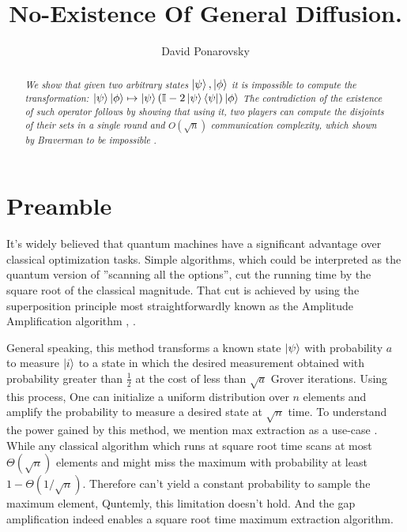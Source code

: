 \documentclass{article}
\begin{document}
\title{No-Existence Of General Diffusion.}
\author{David Ponarovsky}
\maketitle

\begin{abstract}\textit{We show that given two arbitrary states $\ket{\psi},\ket{\phi}$ it is impossible to compute the transformation: $ \ket{\psi}\ket{\phi} \mapsto \ket{\psi}\left( \mathbb{I} - 2 \ket{\psi}\bra{\psi} \right)\ket{\phi} $ The contradiction of the existence of such operator follows by showing that using it, two players can compute the disjoints of their sets in a single round and $O\left( \sqrt{n} \right)$ communication complexity, which shown by Braverman to be impossible \cite{Braverman}. }
\end{abstract}

\section{Preamble} It's widely believed that quantum machines have a significant advantage over classical optimization tasks. Simple algorithms, which could be interpreted as the quantum version of ''scanning all the options'', cut the running time by the square root of the classical magnitude. That cut is achieved by using the superposition principle most straightforwardly known as the Amplitude Amplification algorithm \cite{Brassard_2002}, \cite{grover1996fast}. 

General speaking, this method transforms a known state $\ket{\psi}$  with probability $a$ to measure $\ket{i}$ to a state in which the desired measurement obtained with probability greater than $\frac{1}{2}$ at the cost of less than $\sqrt{a}$ Grover iterations. Using this process, One can initialize a uniform distribution over $n$ elements and amplify the probability to measure a desired state at $\sqrt{n}$ time. To understand the power gained by this method, we mention max extraction as a use-case \cite{ahuja1999quantum}. While any classical algorithm which runs at square root time scans at most $ \Theta( \sqrt{n} )$ elements and might miss the maximum with probability at least $ 1 - \Theta(1/\sqrt{n})$. Therefore can't yield a constant probability to sample the maximum element, Quntemly, this limitation doesn't hold. And the gap amplification indeed enables a square root time maximum extraction algorithm. 
  
\end{document}
